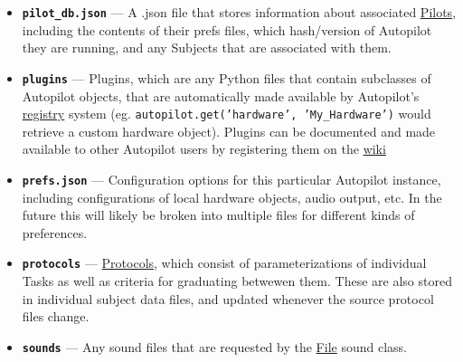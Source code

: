 \begin{itemize}
\item \textbf{\texttt{pilot\_db.json}} --- A .json file that stores information about associated \hyperref[sec:agents]{Pilots}, including the contents of their prefs files, which hash/version of Autopilot they are running, and any Subjects that are associated with them.
\item \textbf{\texttt{plugins}} --- Plugins, which are any Python files that contain subclasses of Autopilot objects, that are automatically made available by Autopilot's \href{https://docs.auto-pi-lot.com/en/latest/utils/registry.html}{registry} system (eg. \texttt{autopilot.get('hardware', 'My_Hardware')} would retrieve a custom hardware object). Plugins can be documented and made available to other Autopilot users by registering them on the \href{https://wiki.auto-pi-lot.com/index.php/Autopilot_Plugins}{wiki}
\item \textbf{\texttt{prefs.json}} --- Configuration options for this particular Autopilot instance, including configurations of local hardware objects, audio output, etc. In the future this will likely be broken into multiple files for different kinds of preferences.
\item \textbf{\texttt{protocols}} --- \hyperref[sec:tasks]{Protocols}, which consist of parameterizations of individual Tasks as well as criteria for graduating betwewen them. These are also stored in individual subject data files, and updated whenever the source protocol files change.
\item \textbf{\texttt{sounds}} --- Any sound files that are requested by the \href{https://docs.auto-pi-lot.com/en/latest/stim/sound/sounds.html\#autopilot.stim.sound.sounds.File}{File} sound class.
\end{itemize}




